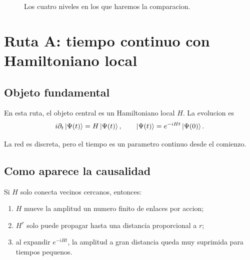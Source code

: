 \begin{figure}[h!]
\centering
{}
\caption{Los cuatro niveles en los que haremos la comparacion.}
\end{figure}

\section{Ruta A: tiempo continuo con Hamiltoniano local}
\subsection{Objeto fundamental}
En esta ruta, el objeto central es un Hamiltoniano local \(H\). La evolucion es
\begin{equation}
i\partial_t \ket{\Psi(t)} = H\ket{\Psi(t)},
\qquad
\ket{\Psi(t)} = e^{-iHt}\ket{\Psi(0)}.
\label{c20:eq:cont-evol}
\end{equation}

La red es discreta, pero el tiempo es un parametro continuo desde el comienzo.

\subsection{Como aparece la causalidad}
Si \(H\) solo conecta vecinos cercanos, entonces:
\begin{enumerate}[label=\arabic*.]
    \item \(H\) mueve la amplitud un numero finito de enlaces por accion;
    \item \(H^r\) solo puede propagar hasta una distancia proporcional a \(r\);
    \item al expandir \(e^{-iHt}\), la amplitud a gran distancia queda muy suprimida para tiempos pequenos.
\end{enumerate}

